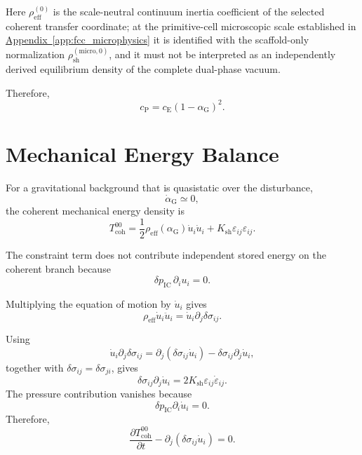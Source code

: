 Here $\rho_{\mathrm{eff}}^{(0)}$ is the scale-neutral continuum inertia coefficient of the selected coherent transfer coordinate; at the primitive-cell microscopic scale established in \hyperref[app:fcc_microphysics]{Appendix~\ref*{app:fcc_microphysics}} it is identified with the scaffold-only normalization $\rho_{\mathrm{sh}}^{(\mathrm{micro},0)}$, and it must not be interpreted as an independently derived equilibrium density of the complete dual-phase vacuum.

Therefore,
\begin{equation}
    c_{\mathrm{P}}
    =
    c_{\mathrm{E}}(1-\alpha_{\mathrm{G}})^{2}.
\end{equation}

\section{Mechanical Energy Balance}

For a gravitational background that is quasistatic over the disturbance,
\begin{equation}
    \dot{\alpha}_{\mathrm{G}} \simeq 0,
\end{equation}
the coherent mechanical energy density is
\begin{equation}
    T_{\mathrm{coh}}^{00} = \frac{1}{2} \rho_{\mathrm{eff}}(\alpha_{\mathrm{G}}) \dot{u}_i\dot{u}_i + K_{\mathrm{sh}} \varepsilon_{ij}\varepsilon_{ij}.
\end{equation}

The constraint term does not contribute independent stored energy on the coherent branch because
\begin{equation}
    \delta p_{\mathrm{IC}}\,\partial_i u_i = 0.
\end{equation}

Multiplying the equation of motion by $\dot{u}_i$ gives
\begin{equation}
    \rho_{\mathrm{eff}} \dot{u}_i\ddot{u}_i = \dot{u}_i\partial_j\delta\sigma_{ij}.
\end{equation}

Using
\begin{equation}
    \dot{u}_i\partial_j\delta\sigma_{ij} = \partial_j \left( \delta\sigma_{ij}\dot{u}_i \right) - \delta\sigma_{ij}\partial_j\dot{u}_i,
\end{equation}
together with $\delta\sigma_{ij}=\delta\sigma_{ji}$, gives
\begin{equation}
    \delta\sigma_{ij}\partial_j\dot{u}_i = 2K_{\mathrm{sh}} \varepsilon_{ij}\dot{\varepsilon}_{ij}.
\end{equation}
The pressure contribution vanishes because
\begin{equation}
    \delta p_{\mathrm{IC}}\partial_i\dot{u}_i=0.
\end{equation}
Therefore,
\begin{equation}
    \frac{\partial T_{\mathrm{coh}}^{00}}{\partial t} - \partial_j \left( \delta\sigma_{ij}\dot{u}_i \right) = 0.
\end{equation}


